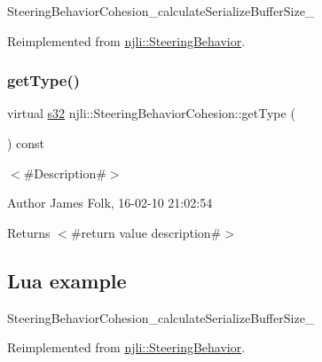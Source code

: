 \begin{DoxyCodeInclude}
\end{DoxyCodeInclude}
Steering\+Behavior\+Cohesion\+\_\+calculate\+Serialize\+Buffer\+Size\+\_\+ 

Reimplemented from \mbox{\hyperlink{classnjli_1_1_steering_behavior_abb58d6982dc295fc3e90f096f51b0ef8}{njli\+::\+Steering\+Behavior}}.

\mbox{\label{classnjli_1_1_steering_behavior_cohesion_aeddc5cf6f988277eafd15344c086527d}} 
\subsubsection{\texorpdfstring{get\+Type()}{getType()}}
{\footnotesize\ttfamily virtual \mbox{\hyperlink{_util_8h_aa62c75d314a0d1f37f79c4b73b2292e2}{s32}} njli\+::\+Steering\+Behavior\+Cohesion\+::get\+Type (\begin{DoxyParamCaption}{ }\end{DoxyParamCaption}) const\hspace{0.3cm}{\ttfamily [virtual]}}



$<$\#\+Description\#$>$ 

\begin{DoxyAuthor}{Author}
James Folk, 16-\/02-\/10 21\+:02\+:54
\end{DoxyAuthor}
\begin{DoxyReturn}{Returns}
$<$\#return value description\#$>$
\end{DoxyReturn}
\hypertarget{classnjli_1_1_steering_behavior_wander_ex1}{}\subsection{Lua example}\label{classnjli_1_1_steering_behavior_wander_ex1}

\begin{DoxyCodeInclude}
\end{DoxyCodeInclude}
Steering\+Behavior\+Cohesion\+\_\+calculate\+Serialize\+Buffer\+Size\+\_\+ 

Reimplemented from \mbox{\hyperlink{classnjli_1_1_steering_behavior_ae82bca8468d41aff8c22b76fd359fe9b}{njli\+::\+Steering\+Behavior}}.

